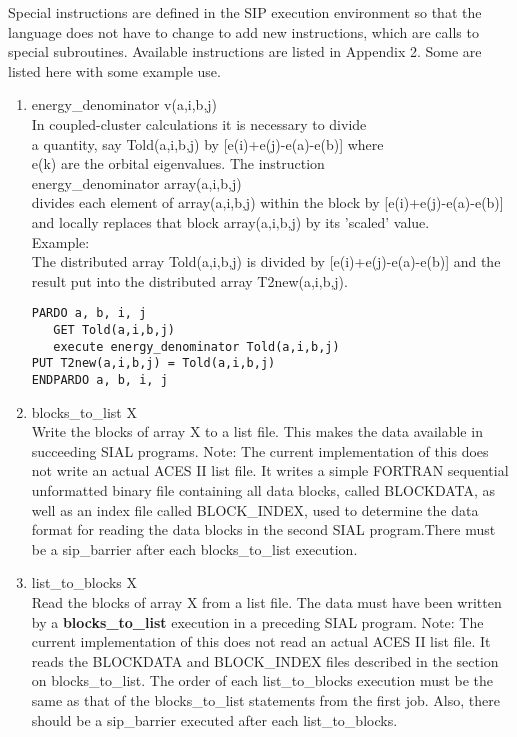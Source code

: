 \documentclass[12pt]{article}
\begin{document}
Special instructions are defined in the SIP execution environment so that the language 
does not have to change to add new instructions, which are calls to special subroutines. 
Available instructions are listed in Appendix 2. Some are listed here with some example 
use.

\begin{enumerate} 

\item energy\_denominator v(a,i,b,j)\\
In coupled-cluster calculations it is necessary to divide\\
a quantity, say Told(a,i,b,j) by [e(i)+e(j)-e(a)-e(b)] where\\
e(k) are the orbital eigenvalues. The instruction\\
energy\_denominator array(a,i,b,j)\\
divides each element of array(a,i,b,j) within the block by [e(i)+e(j)-e(a)-e(b)] and 
locally replaces that block array(a,i,b,j) by its 'scaled' value.\\
Example:\\
The distributed array Told(a,i,b,j) is divided by [e(i)+e(j)-e(a)-e(b)] and the result 
put into the distributed array T2new(a,i,b,j).\\

\begin{verbatim}
PARDO a, b, i, j
   GET Told(a,i,b,j)
   execute energy_denominator Told(a,i,b,j)
PUT T2new(a,i,b,j) = Told(a,i,b,j)
ENDPARDO a, b, i, j
\end{verbatim}

\item blocks\_to\_list X\\ 
Write the blocks of array X to a list file. This makes the data available in 
succeeding SIAL programs. Note: The current implementation of this does not write an 
actual ACES II list file. It writes a simple FORTRAN sequential unformatted binary 
file containing all data blocks, called BLOCKDATA, as well as an index file 
called BLOCK\_INDEX, used to determine the data format for reading the data blocks 
in the second SIAL program.There must be a sip\_barrier after each blocks\_to\_list 
execution.



\item list\_to\_blocks X\\ 
Read the blocks of array X from a list file. The data must have been written by a 
{\bf blocks\_to\_list} execution in a preceding SIAL program. Note: The current 
implementation of this does not read an actual ACES II list file. It reads the BLOCKDATA 
and BLOCK\_INDEX files described in the section on blocks\_to\_list. The order of 
each list\_to\_blocks execution must be the same as that of the blocks\_to\_list 
statements from the first job. Also, there should be a sip\_barrier executed after 
each list\_to\_blocks.




\end{enumerate}
\end{document}
